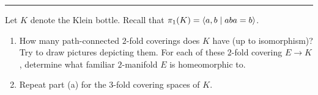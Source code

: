 \documentclass[letterpaper, 12pt]{article}
\begin{document}
\begin{solution}
\begin{enumerate}[(a)]
\end{enumerate}
\end{solution}

\noindent\rule{7in}{2.8pt}
\begin{problem}{5}
Let \(K\) denote the Klein bottle. Recall that \(\pi_1(K)=\langle a,b\mid aba=b\rangle\).
\begin{enumerate}[(1)]
\item How many path-connected \(2\)-fold coverings does \(K\) have (up to isomorphism)? Try to draw pictures depicting them. For each of these \(2\)-fold covering \(E\rightarrow K\), determine what familiar \(2\)-manifold \(E\) is homeomorphic to. 
\item Repeat part (a) for the \(3\)-fold covering spaces of \(K\). 
\end{enumerate}
\end{problem}
\end{document}
